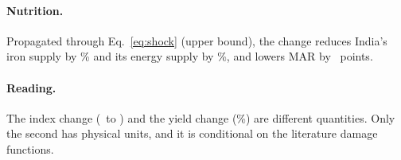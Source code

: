 \paragraph{Nutrition.} Propagated through Eq.~\ref{eq:shock} (upper bound), the change reduces India's iron supply
by \wfDIron\% and its energy supply by \wfDKcal\%, and lowers MAR by \wfDMAR\ points.

\paragraph{Reading.} The index change (\wfFFourHist\ to \wfFFourFut) and the yield change (\wfdY\%) are different
quantities. Only the second has physical units, and it is conditional on the literature damage functions.
